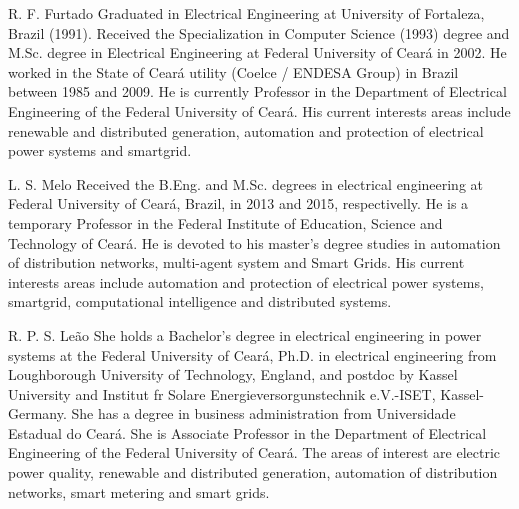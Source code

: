 \documentclass[journal]{IEEEtran}
\begin{document}








\begin{IEEEbiographynophoto}{R. F. Furtado}
  Graduated in Electrical Engineering at University of Fortaleza, Brazil (1991). Received the Specialization in Computer Science (1993) degree and M.Sc. degree in Electrical Engineering at Federal University of Ceará in 2002. He worked in the State of Ceará utility (Coelce / ENDESA Group) in Brazil between 1985 and 2009. He is currently Professor in the Department of Electrical Engineering of the Federal University of Ceará. His current interests areas include renewable and distributed generation, automation and protection of electrical power systems and smartgrid.
\end{IEEEbiographynophoto}
\vspace{-0.5in}
\begin{IEEEbiographynophoto}{L. S. Melo}
  Received the B.Eng. and M.Sc. degrees in electrical engineering at Federal University of Ceará, Brazil, in 2013 and 2015, respectivelly. He is a temporary Professor in the Federal Institute of Education, Science and Technology of Ceará. He is devoted to his master's degree studies in automation of distribution networks, multi-agent system and Smart Grids. His current interests areas include automation and protection of electrical power systems, smartgrid, computational intelligence and distributed systems.
\end{IEEEbiographynophoto}
\vspace{-0.5in}
\begin{IEEEbiographynophoto}{R. P. S. Leão}
  She holds a Bachelor’s degree in electrical engineering in power systems at the Federal University of Ceará, Ph.D. in electrical engineering from Loughborough University of Technology, England, and postdoc by Kassel University and Institut fr Solare Energieversorgunstechnik e.V.-ISET, Kassel-Germany. She has a degree in business administration from Universidade Estadual do Ceará. She is Associate Professor in the Department of Electrical Engineering of the Federal University of Ceará. The areas of interest are electric power quality, renewable and distributed generation, automation of distribution networks, smart metering and smart grids.
\end{IEEEbiographynophoto}
\end{document}
